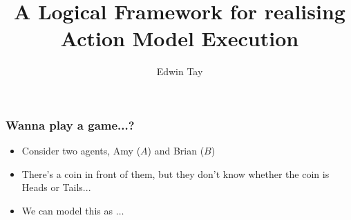 \documentclass{beamer}
\begin{document}
\title{A Logical Framework for realising Action Model Execution}
\author{Edwin Tay}

\begin{comment}
My honours presentation.
Need to discuss project and give a motivating idea.
In general:

given an epistemic goal we can find an action model we can construct an
action model

given an epistemic action model how can we realise it

do no maths, use pictures

don’t say “this is too complicated” - don’t
mention the “too complicated stuff”!
\end{comment}

\frame{\titlepage}

\begin{frame}
\frametitle{Wanna play a game...?}
\begin{itemize}
  \item Consider two agents, Amy ($A$) and Brian ($B$)
  \item There's a coin in front of them, but they don't know whether the coin is
    Heads or Tails...
  \item We can model this as $\ldots$
\end{itemize}
\end{frame}

\begin{frame}
\begin{figure}
\end{figure}
\end{frame}
\end{document}
